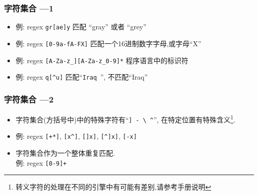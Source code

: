 \documentclass[compress]{beamer}
\begin{document}
\begin{frame}[fragile]
\frametitle{字符集合 ---1}

\begin{itemize}
\item 例: regex {\verb=gr[ae]y=} 匹配 ``gray'' 或者
``grey''

\item 例: regex {\verb=[0-9a-fA-FX]= }
匹配一个16进制数字字母,或字母``X''

\item 例: regex {\verb=[A-Za-z_][A-Za-z_0-9]*= }
程序语言中的标识符

\item 例: regex {\verb=q[^u]=} 匹配``\verb*=Iraq ='',
不匹配``Iraq''
\end{itemize}
\end{frame}

\begin{frame}[fragile]
\frametitle{字符集合 ---2}

\begin{itemize}

\item 字符集合(方括号中)中的特殊字符有``\verb=] - \ ^='', 在特定位置有特殊含义\footnote{转义字符的处理在不同的引擎中有可能有差别,请参考手册说明}.
\item 例: regex {\verb=[+*]=}, {
\verb=[x^]=}, {\verb=[]x]=}, {
\verb=[^]x]=}, {\verb=[-x]=}

\item 字符集合作为一个整体重复匹配. \\
例: regex { \verb=[0-9]+=}

\end{itemize}
\end{frame}
\end{document}
